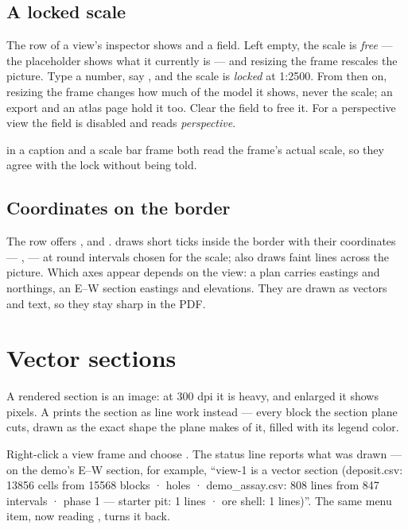 \subsection{A locked scale}

The  row of a view's inspector shows  and a field. Left empty, the scale is \emph{free} — the placeholder shows what it currently is — and resizing the frame rescales the picture. Type a number, say , and the scale is \emph{locked} at 1:2500. From then on, resizing the frame changes how much of the model it shows, never the scale; an export and an atlas page hold it too. Clear the field to free it. For a perspective view the field is disabled and reads \emph{perspective}.

 in a caption and a scale bar frame both read the frame's actual scale, so they agree with the lock without being told.

\subsection{Coordinates on the border}

The  row offers ,  and .  draws short ticks inside the border with their coordinates — ,  — at round intervals chosen for the scale;  also draws faint lines across the picture. Which axes appear depends on the view: a plan carries eastings and northings, an E–W section eastings and elevations. They are drawn as vectors and text, so they stay sharp in the PDF.

\section{Vector sections}\label{sec:compo-vector}

A rendered section is an image: at 300 dpi it is heavy, and enlarged it shows pixels. A  prints the section as line work instead — every block the section plane cuts, drawn as the exact shape the plane makes of it, filled with its legend color.

Right-click a view frame and choose . The status line reports what was drawn — on the demo's E–W section, for example, “view-1 is a vector section (deposit.csv: 13856 cells from 15568 blocks · holes · demo\_assay.csv: 808 lines from 847 intervals · phase 1 — starter pit: 1 lines · ore shell: 1 lines)”. The same menu item, now reading , turns it back.


